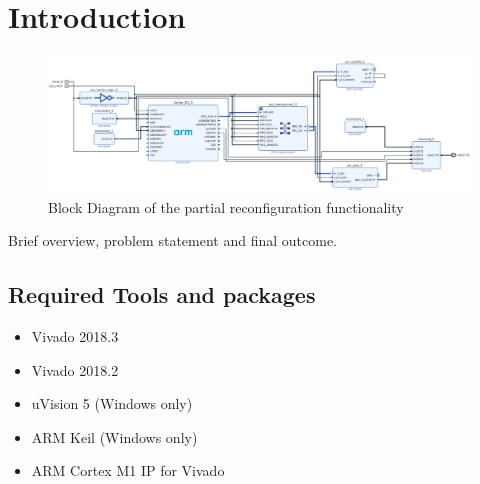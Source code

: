 \section{Introduction}
\begin{figure}[t]
    \centering
    \includegraphics[width=\textwidth]{figures/pr_blockDesign.pdf}
    \caption{Block Diagram of the partial reconfiguration functionality}\label{fig:prBlockDesign}
\end{figure}

Brief overview, problem statement and final outcome.

\subsection{Required Tools and packages}

\begin{itemize}
    \item Vivado 2018.3
    \item Vivado 2018.2
    \item uVision 5 (Windows only)
    \item ARM Keil (Windows only)
    \item ARM Cortex M1 IP for Vivado
\end{itemize}
